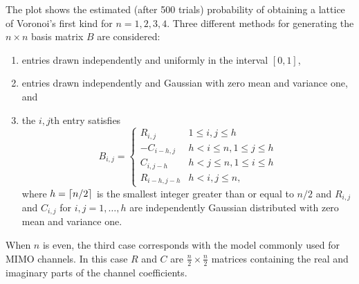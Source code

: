 \documentclass[a4paper,10pt]{article}
\begin{document}



The plot shows the estimated (after 500 trials) probability of obtaining a lattice of Voronoi's first kind for $n=1,2,3,4$.  Three different methods for generating the $n \times n$ basis matrix $B$ are considered: 
\begin{enumerate}
\item entries drawn independently and uniformly in the interval $[0,1]$, 
\item entries drawn independently and Gaussian with zero mean and variance one, and 
\item the $i,j$th entry satisfies
\[
B_{i,j} = \begin{cases}
R_{i,j} & 1 \leq i,j \leq h \\
-C_{i-h,j} & h < i \leq n, 1 \leq j \leq h \\
C_{i,j-h} & h < j \leq n, 1 \leq i \leq h \\
R_{i-h,j-h} & h < i,j \leq n,
\end{cases}
\]
where $h = \lceil n/2 \rceil$ is the smallest integer greater than or equal to $n/2$ and $R_{i,j}$ and $C_{i,j}$ for $i,j = 1,\dots,h$ are independently Gaussian distributed with zero mean and variance one. 
\end{enumerate}
When $n$ is even, the third case corresponds with the model commonly used for MIMO channels.  In this case $R$ and $C$ are $\tfrac{n}{2} \times \tfrac{n}{2}$ matrices containing the real and imaginary parts of the channel coefficients.
\end{document}

